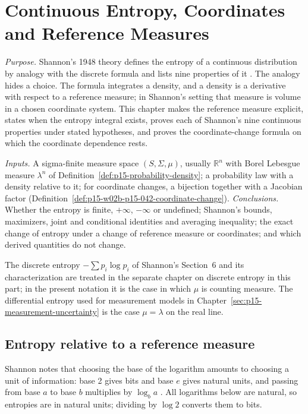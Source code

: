 \chapter{Continuous Entropy, Coordinates and Reference Measures}
\label{sec:p15-w02b-p15-042-continuous-entropy}

\emph{Purpose.} Shannon's 1948 theory defines the entropy of a continuous
distribution by analogy with the discrete formula and lists nine properties
of it \cite[sec.~20, pp.~35--38]{Shannon1948MathematicalTheory}. The analogy hides a
choice. The formula integrates a density, and a density is a derivative with
respect to a reference measure; in Shannon's setting that measure is volume in
a chosen coordinate system. This chapter makes the reference measure explicit,
states when the entropy integral exists, proves each of Shannon's nine
continuous properties under stated hypotheses, and proves the coordinate-change
formula on which the coordinate dependence rests.

\emph{Inputs.} A sigma-finite measure space \((S,\Sigma,\mu)\), usually
\(\mathbb R^n\) with Borel Lebesgue measure \(\lambda^n\) of
Definition~\ref{def:p15-probability-density}; a probability law with a
density relative to it; for coordinate changes, a bijection together with a
Jacobian factor (Definition~\ref{def:p15-w02b-p15-042-coordinate-change}).
\emph{Conclusions.} Whether the entropy is finite, \(+\infty\), \(-\infty\) or
undefined; Shannon's bounds, maximizers, joint and conditional identities and
averaging inequality; the exact change of entropy under a change of reference
measure or coordinates; and which derived quantities do not change.

The discrete entropy \(-\sum p_i\log p_i\) of Shannon's Section~6 and its
characterization are treated in the separate chapter on discrete entropy in
this part; in the present notation it is the case in which \(\mu\) is
counting measure. The differential entropy used for measurement models in
Chapter~\ref{sec:p15-measurement-uncertainty} is the case \(\mu=\lambda\)
on the real line.

\section{Entropy relative to a reference measure}
\label{sec:p15-w02b-p15-042-reference}

Shannon notes that choosing the base of the logarithm amounts to choosing a
unit of information: base 2 gives bits and base \(e\) gives natural units, and
passing from base \(a\) to base \(b\) multiplies by \(\log_b a\)
\cite[pp.~1--2]{Shannon1948MathematicalTheory}. All logarithms below are natural, so
entropies are in natural units; dividing by \(\log 2\) converts them to bits.

